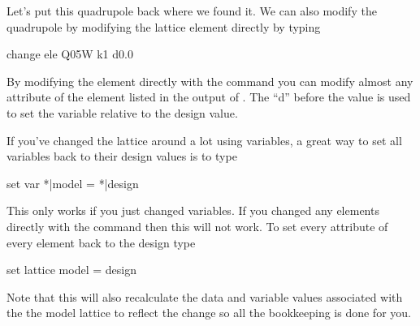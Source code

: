 Let's put this quadrupole back where we found it. We can also modify
the quadrupole by modifying the lattice element directly by typing
\begin{example}
  change ele Q05W k1 d0.0
\end{example}
By modifying the element directly with the  command
you can modify almost any attribute of the element listed in the
output of .  The ``d'' before the value is used to
set the variable relative to the design value.

If you've changed the lattice around a lot using variables, a great
way to set all variables back to their design values is to type
\begin{example}
  set var *|model = *|design
\end{example}
This only works if you just changed variables. If you changed any
elements directly with the  command then this will not
work. To set every attribute of every element back to the design type
\begin{example}
  set lattice model = design
\end{example}
Note that this will also recalculate the data and variable values
associated with the the model lattice to reflect the change so all the
bookkeeping is done for you.
